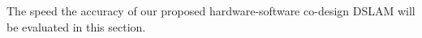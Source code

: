 \label{sec:experiment}
The speed the accuracy of our proposed hardware-software co-design DSLAM will be evaluated in this section.

\section{}